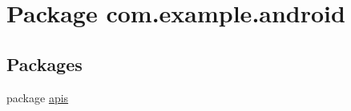 \hypertarget{namespacecom_1_1example_1_1android}{\section{Package com.\-example.\-android}
\label{namespacecom_1_1example_1_1android}
}
\subsection*{Packages}
\begin{DoxyCompactItemize}
\item 
package \hyperlink{namespacecom_1_1example_1_1android_1_1apis}{apis}
\end{DoxyCompactItemize}
